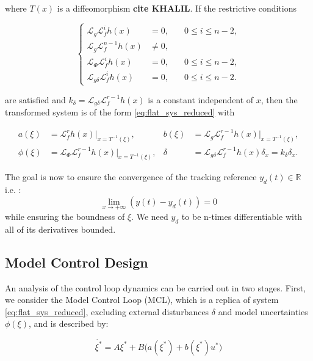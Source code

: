 where \( T(x) \) is a diffeomorphism \textbf{cite KHALIL}. If the restrictive conditions


\begin{equation}
\left\{
\begin{aligned}
\mathcal{L}_g \mathcal{L}_f^i h(x) &= 0, \quad & 0 \leq i \leq n-2, \\
\mathcal{L}_g \mathcal{L}_f^{n-1} h(x) &\neq 0, \\
\mathcal{L}_{\Phi} \mathcal{L}_f^i h(x) &= 0, \quad & 0 \leq i \leq n-2, \\
\mathcal{L}_{g\delta} \mathcal{L}_f^i h(x) &= 0, \quad & 0 \leq i \leq n-2.
\end{aligned}
\right.
\end{equation}


are satisfied and \( k_{\delta} = \mathcal{L}_{g\delta} \mathcal{L}_f^{r-1} h(x) \) is a constant independent of \( x \), then the transformed system is of the form \ref{eq:flat_sys_reduced} with

\begin{align}
a(\xi) &= \mathcal{L}_f^r h(x)\big|_{x=T^{-1}(\xi)}, & b(\xi) &= \mathcal{L}_g \mathcal{L}_f^{r-1} h(x)\big|_{x=T^{-1}(\xi)}, \\
\phi(\xi) &= \mathcal{L}_{\Phi} \mathcal{L}_f^{r-1} h(x)\big|_{x=T^{-1}(\xi)}, & \delta &= \mathcal{L}_{g\delta} \mathcal{L}_f^{r-1} h(x) \delta_x = k_{\delta} \delta_x.
\end{align}

The goal is now to ensure the convergence of the tracking reference \(y_d(t) \in \mathbb{R}\) i.e. : 
\[\lim\limits_{x \to +\infty} \left( y(t) - y_d(t) \right) = 0\]
while ensuring the boundness of \(\xi\). We need \(y_d\) to be n-times differentiable with all of its derivatives bounded.


\subsection{Model Control Design}

An analysis of the control loop dynamics can be carried out in two stages. First, we consider the Model Control Loop (MCL), which is a replica of system \ref{eq:flat_sys_reduced}, excluding external disturbances \(\delta\) and model uncertainties \(\phi(\xi)\), and is described by:

\begin{equation}
\label{eq:MCL_open_loop}
  \dot{\xi^*} = A\xi^* + B\big(a(\xi^*) + b(\xi^*)u^* \big)
\end{equation}

